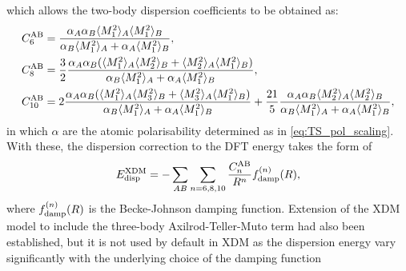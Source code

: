 which allows the two-body dispersion coefficients to be obtained as:
\begin{align}
    C_6^{\mbox{\scriptsize{AB}}}&=\frac{\alpha_A\alpha_B\langle M_{1}^2\rangle_A\langle M_{1}^2\rangle_B}{\alpha_B \langle M_{1}^2\rangle_A+\alpha_A \langle M_{1}^2\rangle_B}, \label{eq:XDM_C6}\\
    C_8^{\mbox{\scriptsize{AB}}}&=\frac{3}{2}\frac{\alpha_A \alpha_B (\langle M_{1}^2\rangle_A \langle M_{2}^2\rangle_B+ \langle M_{2}^2\rangle_A\langle M_{1}^2\rangle_B)}{\alpha_B \langle M_{1}^2\rangle_A+\alpha_A \langle M_{1}^2\rangle_B}, \label{eq:XDM_C8}\\
    C_{10}^{\mbox{\scriptsize{AB}}}&=2\frac{\alpha_A \alpha_B (\langle M_{1}^2\rangle_A \langle M_{3}^2\rangle_B+ \langle M_{3}^2\rangle_A\langle M_{1}^2\rangle_B)}{\alpha_B \langle M_{1}^2\rangle_A+\alpha_A \langle M_{1}^2\rangle_B}+\frac{21}{5}\frac{\alpha_A\alpha_B\langle M_{2}^2\rangle_A\langle M_{2}^2\rangle_B}{\alpha_B \langle M_{1}^2\rangle_A+\alpha_A \langle M_{1}^2\rangle_B}, \label{eq:XDM_C10}
 \end{align}
in which $\alpha$ are the atomic polarisability determined as in \cref{eq:TS_pol_scaling}. With these, the dispersion correction to the DFT energy takes the form of 
\begin{equation}\label{eq:XDM_disp_energy}
E_{\mbox{\scriptsize{disp}}}^{\mbox{\scriptsize{XDM}}}=-\sum_{AB}\sum_{n=6,8,10}\frac{C_n^{\mbox{\scriptsize{AB}}}}{R^n}f_{\mbox{\scriptsize{damp}}}^{(n)}(R),
\end{equation}
where $f_{\mbox{\scriptsize{damp}}}^{(n)}(R)$ is the Becke-Johnson damping function. Extension of the XDM model to include the three-body Axilrod-Teller-Muto term had also been established,\cite{otero2013many} but it is not used by default in XDM as the dispersion energy vary significantly with the underlying choice of the damping function 



